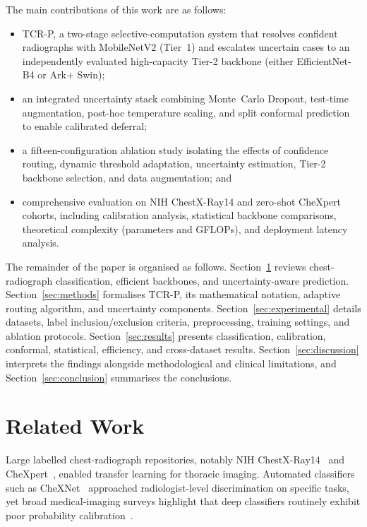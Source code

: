 \documentclass[diagnostics,article,submit,moreauthors]{Definitions/mdpi}
\newcommand{\rev}[1]{#1}
\begin{document}
The main contributions of this work are as follows:
\begin{itemize}
\item \rev{TCR-P, a two-stage selective-computation system that resolves confident radiographs with MobileNetV2 (Tier~1) and escalates uncertain cases to an independently evaluated high-capacity Tier-2 backbone (either EfficientNet-B4 or Ark+ Swin);}
\item an integrated uncertainty stack combining Monte~Carlo Dropout, test-time augmentation, post-hoc temperature scaling, and split conformal prediction to enable calibrated deferral;
\item a fifteen-configuration ablation study isolating the effects of confidence routing, dynamic threshold adaptation, uncertainty estimation, Tier-2 backbone selection, and data augmentation; and
\item \rev{comprehensive evaluation on NIH ChestX-Ray14 and zero-shot CheXpert cohorts, including calibration analysis, statistical backbone comparisons, theoretical complexity (parameters and GFLOPs), and deployment latency analysis.}
\end{itemize}

The remainder of the paper is organised as follows. Section~\ref{sec:related} reviews chest-radiograph classification, efficient backbones, and uncertainty-aware prediction. Section~\ref{sec:methods} formalises TCR-P, its mathematical notation, adaptive routing algorithm, and uncertainty components. Section~\ref{sec:experimental} details datasets, label inclusion/exclusion criteria, preprocessing, training settings, and ablation protocols. Section~\ref{sec:results} presents classification, calibration, conformal, statistical, efficiency, and cross-dataset results. Section~\ref{sec:discussion} interprets the findings alongside methodological and clinical limitations, and Section~\ref{sec:conclusion} summarises the conclusions.

\section{Related Work}
\label{sec:related}

Large labelled chest-radiograph repositories, notably NIH ChestX-Ray14~\cite{wang2017chestxray} and CheXpert~\cite{irvin2019chexpert}, enabled transfer learning for thoracic imaging. Automated classifiers such as CheXNet~\cite{rajpurkar2018chexnext} approached radiologist-level discrimination on specific tasks, \rev{yet broad medical-imaging surveys highlight that deep classifiers routinely exhibit poor probability calibration}~\cite{litjens2017survey}.
\end{document}

